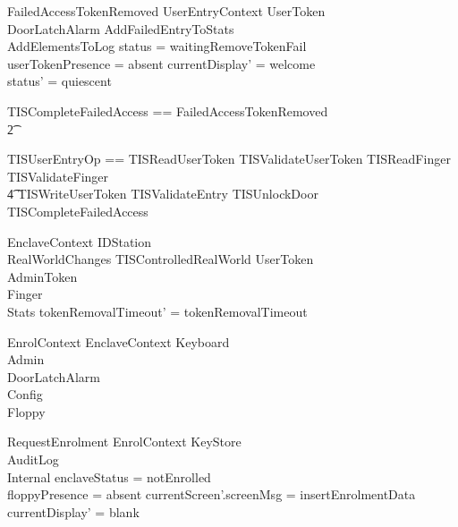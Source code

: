 \begin{schema}{FailedAccessTokenRemoved}
        UserEntryContext
\also
	\Xi UserToken
\\      \Xi DoorLatchAlarm
\also
        AddFailedEntryToStats
\\      AddElementsToLog
\where
        status = waitingRemoveTokenFail
\\      userTokenPresence = absent
\also
        currentDisplay' = welcome
\\      status' = quiescent
\end{schema}

\begin{zed}
        TISCompleteFailedAccess == FailedAccessTokenRemoved 
\\      \t2     \lor [ WaitingTokenRemoval | status = waitingRemoveTokenFail ] 
\end{zed}

\begin{zed}
        TISUserEntryOp == TISReadUserToken \lor TISValidateUserToken \lor TISReadFinger \lor
                TISValidateFinger 
\\ \t4          \lor TISWriteUserToken \lor  TISValidateEntry \lor TISUnlockDoor \lor
                TISCompleteFailedAccess 
\end{zed}

\begin{schema}{EnclaveContext}
        \Delta IDStation
\\      RealWorldChanges
\also
        \Xi TISControlledRealWorld
\also
        \Xi UserToken
\\      \Xi AdminToken
\\      \Xi Finger
\\      \Xi Stats
\where
        tokenRemovalTimeout' = tokenRemovalTimeout
\end{schema}

\begin{schema}{EnrolContext}
        EnclaveContext
\also
        \Xi Keyboard
\\      \Xi Admin
\\      \Xi DoorLatchAlarm
\\      \Xi Config
\\      \Xi Floppy
\end{schema}

\begin{schema}{RequestEnrolment}
        EnrolContext
\also
        \Xi KeyStore
\\      \Xi AuditLog
\\      \Xi Internal
\where
        enclaveStatus = notEnrolled
\\      floppyPresence = absent
\also
        currentScreen'.screenMsg = insertEnrolmentData
\also
        currentDisplay' = blank
\end{schema}

